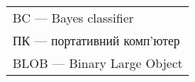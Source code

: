 
\begin{tabular}{l}
	BC — Bayes classifier \\	         					
	ПК — портативний комп'ютер	\\
	BLOB — Binary Large Object \\
\end{tabular}